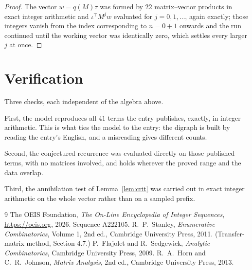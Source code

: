 \documentclass[11pt,a4paper]{article}
\theoremstyle{plain}
\theoremstyle{definition}
\begin{document}
\begin{proof}
The vector $w=q(M)\tau$ was formed by $22$ matrix--vector products in exact integer
arithmetic and $\iota^{\!\top}M^{j}w$ evaluated for $j=0,1,\dots$, again exactly; those
integers vanish from the index corresponding to $n=0+1$ onwards and the run continued
until the working vector was identically zero, which settles every larger $j$ at once.
\end{proof}

\section{Verification}

Three checks, each independent of the algebra above.

First, the model reproduces all $41$ terms the entry publishes, exactly, in integer
arithmetic. This is what ties the model to the entry: the digraph is built by reading the
entry's English, and a misreading gives different counts.

Second, the conjectured recurrence was evaluated directly on those published terms, with no
matrices involved, and holds wherever the proved range and the data overlap.

Third, the annihilation test of Lemma~\ref{lem:crit} was carried out in exact integer
arithmetic on the whole vector rather than on a sampled prefix.

\begin{thebibliography}{9}
 The OEIS Foundation, \emph{The On-Line Encyclopedia of Integer
Sequences}, \url{https://oeis.org}, 2026. Sequence A222105.
 R.~P.~Stanley, \emph{Enumerative Combinatorics}, Volume 1, 2nd ed.,
Cambridge University Press, 2011. (Transfer-matrix method, Section 4.7.)
 P.~Flajolet and R.~Sedgewick, \emph{Analytic Combinatorics}, Cambridge
University Press, 2009.
 R.~A.~Horn and C.~R.~Johnson, \emph{Matrix Analysis}, 2nd ed., Cambridge
University Press, 2013.
\end{thebibliography}
\end{document}
